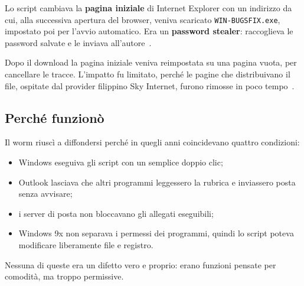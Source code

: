 Lo script cambiava la \textbf{pagina iniziale} di Internet Explorer con un indirizzo da cui, alla successiva apertura del browser, veniva scaricato \texttt{WIN-BUGSFIX.exe}, impostato poi per l'avvio automatico. Era un \textbf{password stealer}: raccoglieva le password salvate e le inviava all'autore~\cite{bishop2000, markoff2000}.

Dopo il download la pagina iniziale veniva reimpostata su una pagina vuota, per cancellare le tracce. L'impatto fu limitato, perché le pagine che distribuivano il file, ospitate dal provider filippino Sky Internet, furono rimosse in poco tempo~\cite{markoff2000}.

\subsection{Perché funzionò}

Il worm riuscì a diffondersi perché in quegli anni coincidevano quattro condizioni:

\begin{itemize}
    \item Windows eseguiva gli script con un semplice doppio clic;
    \item Outlook lasciava che altri programmi leggessero la rubrica e inviassero posta senza avvisare;
    \item i server di posta non bloccavano gli allegati eseguibili;
    \item Windows 9x non separava i permessi dei programmi, quindi lo script poteva modificare liberamente file e registro.
\end{itemize}

Nessuna di queste era un difetto vero e proprio: erano funzioni pensate per comodità, ma troppo permissive.
